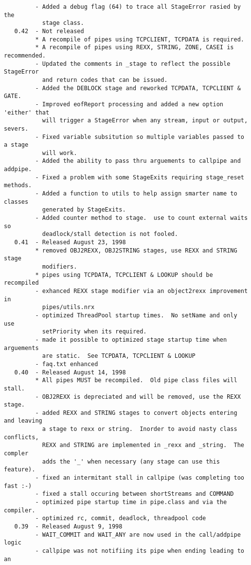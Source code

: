 \begin{verbatim}
         - Added a debug flag (64) to trace all StageError rasied by the
           stage class.
   0.42  - Not released
         * A recompile of pipes using TCPCLIENT, TCPDATA is required.
         * A recompile of pipes using REXX, STRING, ZONE, CASEI is recommended.
         - Updated the comments in _stage to reflect the possible StageError
           and return codes that can be issued.
         - Added the DEBLOCK stage and reworked TCPDATA, TCPCLIENT & GATE.
         - Improved eofReport processing and added a new option 'either' that
           will trigger a StageError when any stream, input or output, severs.
         - Fixed variable subsitution so multiple variables passed to a stage
           will work.
         - Added the ability to pass thru arguements to callpipe and addpipe.
         - Fixed a problem with some StageExits requiring stage_reset methods.
         - Added a function to utils to help assign smarter name to classes
           generated by StageExits.
         - Added counter method to stage.  use to count external waits so
           deadlock/stall detection is not fooled.
   0.41  - Released August 23, 1998
         * removed OBJ2REXX, OBJ2STRING stages, use REXX and STRING stage
           modifiers.
         * pipes using TCPDATA, TCPCLIENT & LOOKUP should be recompiled
         - exhanced REXX stage modifier via an object2rexx improvement in
           pipes/utils.nrx
         - optimized ThreadPool startup times.  No setName and only use
           setPriority when its required.
         - made it possible to optimized stage startup time when arguements
           are static.  See TCPDATA, TCPCLIENT & LOOKUP
         - faq.txt enhanced
   0.40  - Released August 14, 1998
         * All pipes MUST be recompiled.  Old pipe class files will stall.
         - OBJ2REXX is depreciated and will be removed, use the REXX stage.
         - added REXX and STRING stages to convert objects entering and leaving
           a stage to rexx or string.  Inorder to avoid nasty class conflicts,
           REXX and STRING are implemented in _rexx and _string.  The compler
           adds the '_' when necessary (any stage can use this feature).
         - fixed an intermitant stall in callpipe (was completing too fast :-)
         - fixed a stall occuring between shortStreams and COMMAND
         - optimized pipe startup time in pipe.class and via the compiler.
         - optimized rc, commit, deadlock, threadpool code
   0.39  - Released August 9, 1998
         - WAIT_COMMIT and WAIT_ANY are now used in the call/addpipe logic
         - callpipe was not notifiing its pipe when ending leading to an

\end{verbatim}
